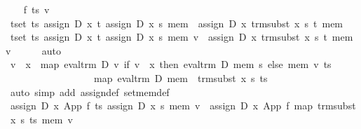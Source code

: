 \begin{isabellebody}
\ \ \isamarkupfalse%
\ f\ ts\ v\isanewline
\ \ \isamarkupfalse%
\ {}{}t{}set\ ts{}\ assign\ D\ x\ t\ {}assign\ D\ x\ s\ mem{}\ {}\ assign\ D\ x\ {}trm{}subst\ x\ s\ t{}\ mem{}\isanewline
\ \ \isamarkupfalse%
\ {}{}t{}set\ ts{}\ assign\ D\ x\ t\ {}assign\ D\ x\ s\ mem{}\ v\ {}\ assign\ D\ x\ {}trm{}subst\ x\ s\ t{}\ mem\ v{}\isanewline
\ \ \ \ \isamarkupfalse%
\ auto\isanewline
\ \ \isamarkupfalse%
\ {}v\ {}\ x\ {}\ map\ {}eval{}trm\ D\ {}{}v{}\ if\ v\ {}\ x\ then\ eval{}trm\ D\ mem\ s\ else\ mem\ v{}{}\ ts\ {}\isanewline
\ \ \ \ \ \ \ \ \ \ \ \ \ \ \ \ \ \ map\ {}eval{}trm\ D\ mem\ {}\ trm{}subst\ x\ s{}\ ts{}\isanewline
\ \ \ \ \isamarkupfalse%
\ {}auto\ simp\ add{}\ assign{}def\ set{}mem{}def{}\isanewline
\ \ \isamarkupfalse%
\ {}assign\ D\ x\ {}App\ f\ ts{}\ {}assign\ D\ x\ s\ mem{}\ v\ {}\ assign\ D\ x\ {}App\ f\ {}map\ {}trm{}subst\ x\ s{}\ ts{}{}\ mem\ v{}\isanewline

\end{isabellebody}
